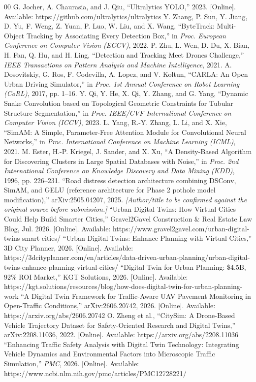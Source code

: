 \documentclass[conference]{IEEEtran}
\begin{document}
\begin{thebibliography}{00}
 G. Jocher, A. Chaurasia, and J. Qiu, ``Ultralytics YOLO,'' 2023. [Online]. Available: https://github.com/ultralytics/ultralytics
 Y. Zhang, P. Sun, Y. Jiang, D. Yu, F. Weng, Z. Yuan, P. Luo, W. Liu, and X. Wang, ``ByteTrack: Multi-Object Tracking by Associating Every Detection Box,'' in \textit{Proc. European Conference on Computer Vision (ECCV)}, 2022.
 P. Zhu, L. Wen, D. Du, X. Bian, H. Fan, Q. Hu, and H. Ling, ``Detection and Tracking Meet Drones Challenge,'' \textit{IEEE Transactions on Pattern Analysis and Machine Intelligence}, 2021.
 A. Dosovitskiy, G. Ros, F. Codevilla, A. Lopez, and V. Koltun, ``CARLA: An Open Urban Driving Simulator,'' in \textit{Proc. 1st Annual Conference on Robot Learning (CoRL)}, 2017, pp. 1--16.
 Y. Qi, Y. He, X. Qi, Y. Zhang, and G. Yang, ``Dynamic Snake Convolution based on Topological Geometric Constraints for Tubular Structure Segmentation,'' in \textit{Proc. IEEE/CVF International Conference on Computer Vision (ICCV)}, 2023.
 L. Yang, R.-Y. Zhang, L. Li, and X. Xie, ``SimAM: A Simple, Parameter-Free Attention Module for Convolutional Neural Networks,'' in \textit{Proc. International Conference on Machine Learning (ICML)}, 2021.
 M. Ester, H.-P. Kriegel, J. Sander, and X. Xu, ``A Density-Based Algorithm for Discovering Clusters in Large Spatial Databases with Noise,'' in \textit{Proc. 2nd International Conference on Knowledge Discovery and Data Mining (KDD)}, 1996, pp. 226--231.
 ``Road distress detection architecture combining DSConv, SimAM, and GELU (reference architecture for Phase 2 pothole model modification),'' arXiv:2505.04207, 2025. \textit{[Author/title to be confirmed against the original source before submission.]}
 ``Urban Digital Twins: How Virtual Cities Could Help Build Smarter Cities,'' Gravel2Gavel Construction \& Real Estate Law Blog, Jul. 2026. [Online]. Available: https://www.gravel2gavel.com/urban-digital-twins-smart-cities/
 ``Urban Digital Twins: Enhance Planning with Virtual Cities,'' 3D City Planner, 2026. [Online]. Available: https://3dcityplanner.com/en/articles/data-driven-urban-planning/urban-digital-twins-enhance-planning-virtual-cities/
 ``Digital Twin for Urban Planning: \$4.5B, 92\% ROI Market,'' KGT Solutions, 2026. [Online]. Available: https://kgt.solutions/resources/blog/how-does-digital-twin-for-urban-planning-work
 ``A Digital Twin Framework for Traffic-Aware UAV Pavement Monitoring in Open-Traffic Conditions,'' arXiv:2606.20742, 2026. [Online]. Available: https://arxiv.org/abs/2606.20742
 O. Zheng et al., ``CitySim: A Drone-Based Vehicle Trajectory Dataset for Safety-Oriented Research and Digital Twins,'' arXiv:2208.11036, 2022. [Online]. Available: https://arxiv.org/abs/2208.11036
 ``Enhancing Traffic Safety Analysis with Digital Twin Technology: Integrating Vehicle Dynamics and Environmental Factors into Microscopic Traffic Simulation,'' \textit{PMC}, 2026. [Online]. Available: https://www.ncbi.nlm.nih.gov/pmc/articles/PMC12728221/
\end{thebibliography}
\end{document}
